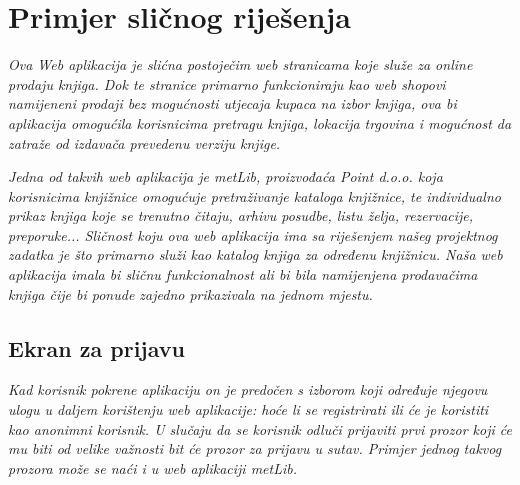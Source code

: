 	\section{Primjer sličnog riješenja}	
		
	\textit{Ova Web aplikacija je slićna postoječim web stranicama koje služe za online prodaju knjiga. Dok te stranice primarno funkcioniraju kao web shopovi namijeneni prodaji bez mogućnosti utjecaja kupaca na izbor knjiga, ova bi aplikacija omogućila korisnicima pretragu knjiga, lokacija trgovina i mogućnost da zatraže od izdavača prevedenu verziju knjige.}
	
	\textit{Jedna od takvih web aplikacija je metLib, proizvođaća Point d.o.o. koja korisnicima knjižnice omogućuje pretraživanje kataloga knjižnice, te individualno prikaz knjiga koje se trenutno čitaju, arhivu posudbe, listu želja, rezervacije, preporuke... Sličnost koju ova web aplikacija ima sa riješenjem našeg projektnog zadatka je što primarno služi kao katalog knjiga za određenu knjižnicu. Naša web aplikacija imala bi sličnu funkcionalnost ali bi bila namijenjena prodavačima knjiga čije bi ponude zajedno prikazivala na jednom mjestu.}
	
	\subsection{Ekran za prijavu}
	
	\textit{Kad korisnik pokrene aplikaciju on je predočen s izborom koji određuje njegovu ulogu u daljem korištenju web aplikacije: hoće li se registrirati ili će je koristiti kao anonimni korisnik. U slučaju da se korisnik odluči prijaviti prvi prozor koji će mu biti od velike važnosti bit će prozor za prijavu u sutav. Primjer jednog takvog prozora može se naći i u web aplikaciji metLib.}
		
